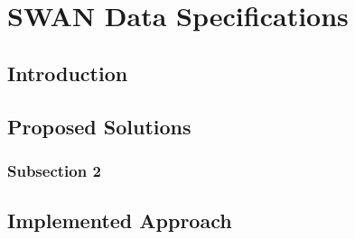 
\chapter{SWAN Data Specifications} %

\label{Chapter4} %



\section{Introduction}



\section{Proposed Solutions}



\subsection{Subsection 2}


\section{Implemented Approach}
